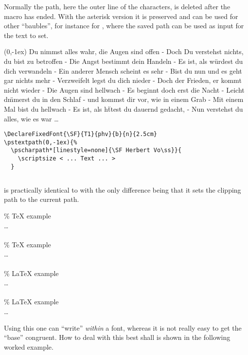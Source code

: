 \documentclass[fontsize=11pt,english,BCOR=10mm,DIV=12,bibliography=totoc,parskip=false,
   headings=small, headinclude=false,footinclude=false,oneside,abstract=on]{pst-doc}
\begin{document}
\medskip\noindent
Normally the path, here the outer line of the characters, is deleted after the
macro  has ended. With the asterisk version it is preserved
and can be used for other ``baubles''{}, for instance for ,
where the saved path can be used as input for the text to set.


\medskip\noindent
{}
\begin{center}
\pstextpath(0,-1ex){}{
\scriptsize Du nimmst alles wahr, die Augen sind offen -
Doch Du verstehst nichts, du bist zu betroffen -
Die Angst bestimmt dein Handeln - 
Es ist, als w\"urdest du dich verwandeln -
Ein anderer Mensch scheint es sehr - 
Bist du nun und es geht gar nichts mehr -
Verzweifelt legst du dich nieder -
Doch der Frieden, er kommt nicht wieder -
Die Augen sind hellwach -
Es beginnt doch erst die Nacht -
Leicht d\"mmerst du in den Schlaf -
und kommst dir vor, wie in einem Grab -
Mit einem Mal bist du hellwach -
Es ist, als h\"ttest du dauernd gedacht, -
Nun verstehst du alles, wie es war \ldots
}
\end{center}

\begin{lstlisting}
\DeclareFixedFont{\SF}{T1}{phv}{b}{n}{2.5cm}
\pstextpath(0,-1ex){%
  \pscharpath*[linestyle=none]{\SF Herbert Vo\ss}}{
    \scriptsize < ... Text ... > 
  }
\end{lstlisting}

\subsection{}\label{sec:psttext:pscharclip}
 is practically identical to
 with the only difference being that it sets the clipping
path to the current path.
%
\begin{BDef}
\OptArgs{} \%  TeX example\\
\quad\ldots\\
\\
\OptArgs{}\%  TeX example\\
\quad\ldots\\
\\
\OptArgs{} \%  LaTeX example\\
\quad\ldots\\
\\
\OptArgs{}\%  LaTeX example\\
\quad\ldots\\
\end{BDef}
%
Using this one can ``write''{} \emph{within} a font, whereas it is not really
easy to get the ``base''{} congruent. How to deal with this best shall is shown
in the following worked example. 
\end{document}
